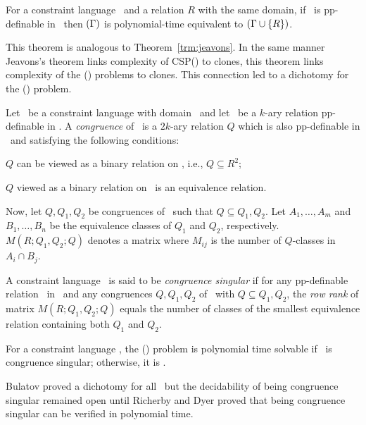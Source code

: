 \begin{theorem} 
For a constraint language \mrelset\ and a relation \(R\) with the same domain,
if \mR\ is pp-definable in \mrelset\ then \ccsp\((\Gamma)\) is polynomial-time equivalent 
to \ccsp\((\Gamma \cup \{{R}\})\)\@.
\end{theorem}

This theorem is analogous to Theorem~\ref{trm:jeavons}. In the same manner Jeavons's theorem
links complexity of CSP(\mrelset) to clones, this theorem
links complexity of the \ccsp(\mrelset) problems to clones. This connection
led to a dichotomy for the \ccsp(\mrelset) problem.

Let \mrelset\ be a constraint language with domain \mD\ and 
let \mR\ be a \(k\)-ary relation pp-definable in \mrelset\@.
A \emph{congruence} of \mR\ is a \(2k\)-ary relation \(Q\) which is also pp-definable in \mrelset\
and satisfying the following conditions:
\begin{inparaenum}[(a)]
\item \(Q\) can be viewed as a binary relation on \mR, i.e., \(Q \subseteq R^2\);
\item \(Q\) viewed as a binary relation on \mR\ is an equivalence relation.
\end{inparaenum}


Now, let \(Q,Q_1,Q_2\) be congruences of \mR\ such that
\(Q\subseteq Q_1,Q_2\). Let \(A_1,\dotsc,A_m\) and \(B_1,\dotsc,B_n\) be
the equivalence classes of \(Q_1\) and \(Q_2\), respectively. 
\(M(R;Q_1,Q_2;Q)\) denotes a matrix where \(M_{ij}\) is the number of \(Q\)-classes in
\(A_i\cap B_j\). 

A constraint language \mrelset\ is said to be \emph{congruence
 singular} if for any pp-definable relation \mR\ in \mrelset\ and any congruences
\(Q,Q_1,Q_2\) of \mR\ with \(Q\subseteq Q_1,Q_2\), the
\emph{row rank} of  matrix \(M(R;Q_1,Q_2;Q)\) equals
the number of classes of the smallest equivalence relation containing
both \(Q_1\) and \(Q_2\)\@. 

\begin{theorem}
For a constraint language \mrelset,
the \ccsp(\mrelset) problem is polynomial time solvable if 
\mrelset\ is congruence singular; otherwise, it is \cpc\@.
\end{theorem}

Bulatov proved a dichotomy for all \mrelset\ but the decidability of being congruence
singular remained open until Richerby and Dyer \cite{DyerR10} 
proved that being congruence singular can be verified in polynomial time.

